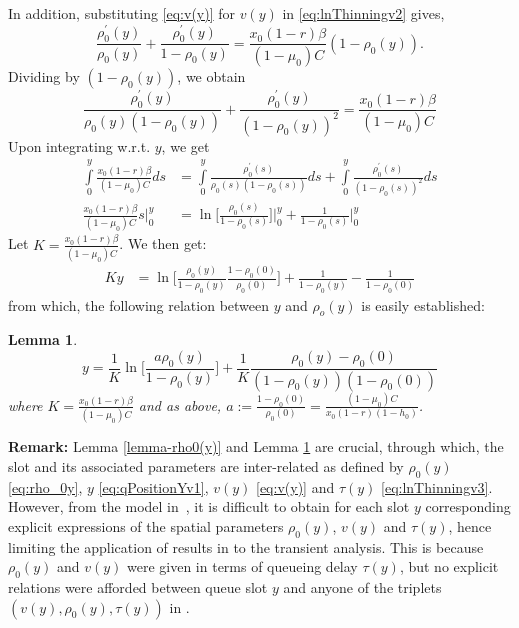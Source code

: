 \documentclass{IEEEtran}
\newtheorem{lemma}{Lemma}
\begin{document}
    In addition, substituting \eqref{eq:v(y)} for $v(y)$ in \eqref{eq:lnThinningv2} gives,
\begin{equation}
        \frac{\rho_0^{'}(y)}{\rho_0(y)}+ \frac{\rho_0^{'}(y)}{1-\rho_0(y)} = \frac{x_0(1-r) \beta}{(1-\mu_0)C}(1-\rho_0(y)). \nonumber
       \end{equation}
    Dividing by $(1-\rho_0(y))$, we obtain
       \begin{equation}
         \frac{\rho_0^{'}(y)}{\rho_0(y)(1-\rho_0(y))}+ \frac{\rho_0^{'}(y)}{(1-\rho_0(y))^2} = \frac{x_0(1-r) \beta}{(1-\mu_0)C}   \nonumber
       \end{equation}
     Upon integrating w.r.t. $y$, we get
       \begin{align}
         \int\limits_0^y \frac{x_0(1-r) \beta}{(1-\mu_0)C}ds &= \int\limits_0^y \frac{\rho_0^{'}(s)}{\rho_0(s)(1-\rho_0(s))}ds+ \int\limits_0^y \frac{\rho_0^{'}(s)}{(1-\rho_0(s))^2}ds \nonumber \\
         \frac{x_0(1-r) \beta}{(1-\mu_0)C}s\bigg|_0^y    &=\ln\bigg[\frac{\rho_0(s)}{1-\rho_0(s)}\bigg] \bigg|_0^y +\frac{1}{1-\rho_0(s)}\bigg|_0^y \nonumber
        \end{align}
    Let $K=\frac{x_0 (1-r)\beta}{(1-\mu_0)C}$. We then get:
        \begin{align}
            Ky&= \ln\bigg[\frac{\rho_0(y)}{1-\rho_0(y)}\frac{1-\rho_0(0)}{\rho_0(0)}\bigg]+\frac{1}{1-\rho_0(y)}-\frac{1}{1-\rho_0(0)} \end{align}
from which, the following relation between $y$ and $\rho_o(y)$ is easily established:

\begin{lemma}\label{lemma-y}
    \begin{equation}
y = \frac{1}{K}\ln\bigg[\frac{a\rho_0(y)}{1-\rho_0(y)}\bigg]+\frac{1}{K}\frac{\rho_0(y)-\rho_0(0)}{(1-\rho_0(y))(1-\rho_0(0))}\label{eq:qPositionYv1}
    \end{equation}
where $K=\frac{x_0 (1-r)\beta}{(1-\mu_0)C}$ and as above, $a:=\frac{1-\rho_0(0)}{\rho_0(0)}=\frac{(1-\mu_0)C}{x_0(1-r)(1-h_0)}$.
\end{lemma}

{\bf Remark:} Lemma \ref{lemma-rho0(y)} and Lemma \ref{lemma-y} are crucial, through which, the slot and its associated parameters are inter-related as defined by $\rho_0(y)$ \eqref{eq:rho_0y},  $y$ \eqref{eq:qPositionYv1}, $v(y)$ \eqref{eq:v(y)} and $\tau(y)$ \eqref{eq:lnThinningv3}. However, from the model in~\cite{ChokeToN04}, it is difficult to obtain for each slot $y$ corresponding explicit expressions of the spatial parameters $\rho_0(y)$, $v(y)$ and $\tau(y)$, hence limiting the application of results in \cite{ChokeToN04} to the transient analysis. This is because $\rho_0(y)$ and $v(y)$ were given in terms of queueing delay $\tau(y)$, but no explicit relations were afforded between queue slot $y$ and anyone of the triplets $(v(y), \rho_0(y), \tau(y))$ in \cite{ChokeToN04}.
\end{document}
